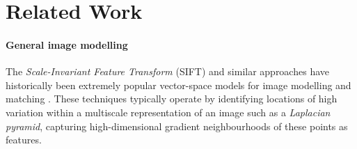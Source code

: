 \documentclass{mpaper}
\begin{document}
%
%
%

\section{Related Work}
\label{sec:related}

\paragraph{General image modelling}
The \emph{Scale-Invariant Feature Transform} (SIFT) and similar approaches have historically been extremely popular vector-space models for image modelling and matching \cite{SIFT,Sift-Variants-Comparison}.
These techniques typically operate by identifying locations of high variation within a multiscale representation of an image such as a \emph{Laplacian pyramid}, capturing high-dimensional gradient neighbourhoods of these points as features.
\end{document}
